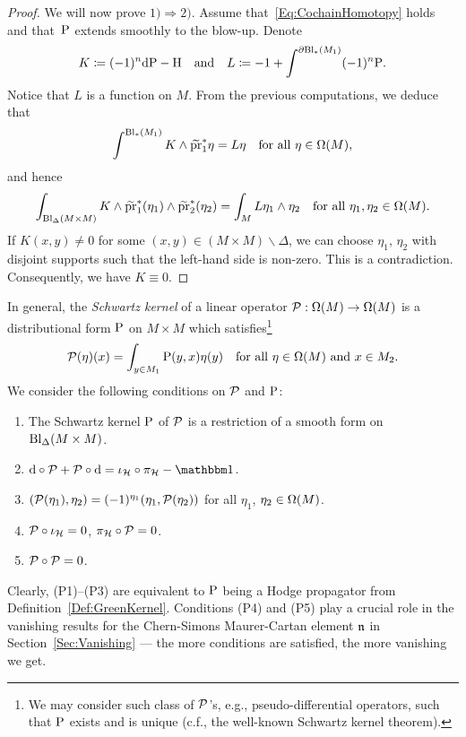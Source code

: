 \documentclass[\MainFolder/Text.tex]{subfiles}
\begin{document}
\begin{proof}
We will now prove $1) \Longrightarrow 2)$. Assume that~\eqref{Eq:CochainHomotopy} holds and that~$\mathrm{P}$ extends smoothly to the blow-up. Denote
$$K\coloneqq (-1)^n \mathrm{d} \mathrm{P} - \mathrm{H}\quad\text{and}\quad L\coloneqq -1 +  \int^{\partial \mathrm{Bl}_*(M_1)} (-1)^n \mathrm{P}. $$
Notice that $L$ is a function on $M$. From the previous computations, we deduce that 
$$ \int^{\mathrm{Bl}_*(M_1)} K\wedge \widetilde{\operatorname{\mathrm{pr}}}_1^*\eta = L\eta\quad\text{for all }\eta\in \Omega(M), $$
and hence
$$ \int_{\mathrm{Bl}_{\Delta}(M\times M)} K \wedge \widetilde{\operatorname{\mathrm{pr}}}_1^*(\eta_1) \wedge \widetilde{\operatorname{\mathrm{pr}}}_2^*(\eta_2)  = \int_M L \eta_1 \wedge \eta_2 \quad\text{for all }\eta_1, \eta_2 \in \Omega(M). $$
If $K(x,y) \neq 0$ for some $(x,y)\in (M\times M)\backslash\Delta$, we can choose $\eta_1$, $\eta_2$ with disjoint supports such that the left-hand side is non-zero. This is a contradiction. Consequently, we have $K\equiv 0$.
\end{proof}

In general, the \emph{Schwartz kernel} of a linear operator $\mathcal{P}: \Omega(M) \rightarrow \Omega(M)$ is a distributional form $\mathrm{P}$ on $M\times M$ which satisfies\footnote{We may consider such class of $\mathcal{P}$'s, e.g., pseudo-differential operators, such that $\mathrm{P}$ exists and is unique (c.f., the well-known Schwartz kernel theorem).} 
\begin{equation*} 
\mathcal{P}(\eta)(x) = \int_{y\in M_1} \mathrm{P}(y,x)\eta(y)\quad\text{for all }\eta\in \Omega(M)\text{ and }x\in M_2.
\end{equation*}
We consider the following conditions on $\mathcal{P}$ and $\mathrm{P}$:\label{ConditionsG} 
\begin{center}
\begin{minipage}{.9\textwidth}
\begin{enumerate}[label=(G\arabic*)]
\item The Schwartz kernel $\mathrm{P}$ of $\mathcal{P}$ is a restriction of a smooth form on $\mathrm{Bl}_\Delta(M\times M)$.
\item $\Dd\circ \Htp + \Htp\circ \Dd = \iota_{\Harm} \circ \pi_\Harm - \Id$.
\item $(\mathcal{P}(\eta_1),\eta_2) = (-1)^{\eta_1}(\eta_1,\mathcal{P}(\eta_2))$ for all $\eta_1$, $\eta_2\in \Omega(M)$.
\item $\mathcal{P} \circ \iota_{\mathcal{H}} = 0$, $\pi_{\mathcal{H}} \circ \mathcal{P} = 0$.
\item $\mathcal{P} \circ \mathcal{P} = 0$.
\end{enumerate}
\end{minipage}
\end{center}
Clearly, (P1)--(P3) are equivalent to $\mathrm{P}$ being a Hodge propagator from Definition~\ref{Def:GreenKernel}. Conditions (P4) and (P5) play a crucial role in the vanishing results for the Chern-Simons Maurer-Cartan element $\mathfrak{n}$ in Section~\ref{Sec:Vanishing} --- the more conditions are satisfied, the more vanishing we get.
\end{document}
